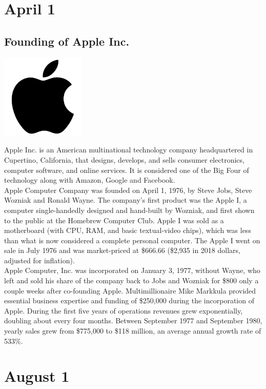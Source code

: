 \documentclass[11pt]{report}
\begin{document}
\section{April 1}
\subsection{Founding of Apple Inc.}
\vspace{2mm}\begin{center}\includegraphics[width=4cm]{./img/appleLogo.jpg}\end{center}
Apple Inc. is an American multinational technology company headquartered in Cupertino, California, that designs, develops, and sells consumer electronics, computer software, and online services. It is considered one of the Big Four of technology along with Amazon, Google and Facebook.\\
\indent Apple Computer Company was founded on April 1, 1976, by Steve Jobs, Steve Wozniak and Ronald Wayne. The company's first product was the Apple I, a computer single-handedly designed and hand-built by Wozniak, and first shown to the public at the Homebrew Computer Club. Apple I was sold as a motherboard (with CPU, RAM, and basic textual-video chips), which was less than what is now considered a complete personal computer. The Apple I went on sale in July 1976 and was market-priced at \$666.66 (\$2,935 in 2018 dollars, adjusted for inflation).\\
\indent Apple Computer, Inc. was incorporated on January 3, 1977, without Wayne, who left and sold his share of the company back to Jobs and Wozniak for \$800 only a couple weeks after co-founding Apple. Multimillionaire Mike Markkula provided essential business expertise and funding of \$250,000 during the incorporation of Apple. During the first five years of operations revenues grew exponentially, doubling about every four months. Between September 1977 and September 1980, yearly sales grew from \$775,000 to \$118 million, an average annual growth rate of 533\%.
\section{August 1}
\end{document}
